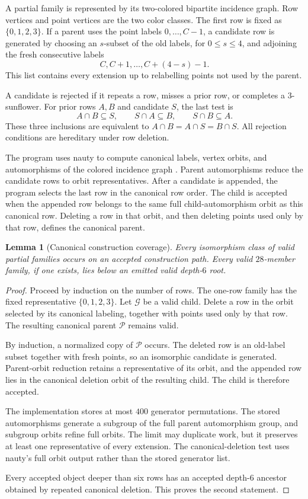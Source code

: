 \documentclass[11pt]{article}
\numberwithin{equation}{section}
\newtheorem{lemma}[lemma]{Lemma}
\theoremstyle{definition}
\theoremstyle{remark}
\begin{document}
A partial family is represented by its two-colored bipartite incidence
graph. Row vertices and point vertices are the two color classes. The first
row is fixed as $\{0,1,2,3\}$. If a parent uses the point labels
$0,\ldots,C-1$, a candidate row is generated by choosing an $s$-subset of
the old labels, for $0\le s\le4$, and adjoining the fresh consecutive labels
\[
 C,C+1,\ldots,C+(4-s)-1.
\]
This list contains every extension up to relabelling points not used by the
parent.

A candidate is rejected if it repeats a row, misses a prior row, or completes
a $3$-sunflower. For prior rows $A,B$ and candidate $S$, the last test is
\[
 A\cap B\subseteq S,
 \qquad S\cap A\subseteq B,
 \qquad S\cap B\subseteq A.
\]
These three inclusions are equivalent to
$A\cap B=A\cap S=B\cap S$. All rejection conditions are hereditary under
row deletion.

The program uses nauty to compute canonical labels, vertex orbits, and
automorphisms of the colored incidence graph
\cite{McKay1998,McKayPiperno2014}. Parent automorphisms reduce the candidate
rows to orbit representatives. After a candidate is appended, the program
selects the last row in the canonical row order. The child is accepted when
the appended row belongs to the same full child-automorphism orbit as this
canonical row. Deleting a row in that orbit, and then deleting points used
only by that row, defines the canonical parent.

\begin{lemma}[Canonical construction coverage]
\label{lem:f43-canonical-coverage}
Every isomorphism class of valid partial families occurs on an accepted
construction path. Every valid $28$-member family, if one exists, lies below
an emitted valid depth-$6$ root.
\end{lemma}

\begin{proof}
Proceed by induction on the number of rows. The one-row family has the fixed
representative $\{0,1,2,3\}$. Let $\mathcal G$ be a valid child. Delete a
row in the orbit selected by its canonical labeling, together with points
used only by that row. The resulting canonical parent $\mathcal P$ remains
valid.

By induction, a normalized copy of $\mathcal P$ occurs. The deleted row is
an old-label subset together with fresh points, so an isomorphic candidate is
generated. Parent-orbit reduction retains a representative of its orbit,
and the appended row lies in the canonical deletion orbit of the resulting
child. The child is therefore accepted.

The implementation stores at most $400$ generator permutations.
The stored automorphisms generate a subgroup of the full parent automorphism
group, and subgroup orbits refine full orbits. The limit may duplicate work,
but it preserves at least one representative of every extension. The
canonical-deletion test uses nauty's full orbit output rather than the stored
generator list.

Every accepted object deeper than six rows has an accepted depth-$6$
ancestor obtained by repeated canonical deletion. This proves the second
statement.
\end{proof}
\end{document}
